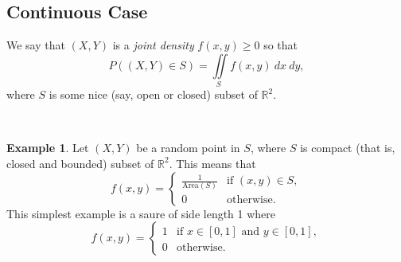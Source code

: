 \documentclass[12pt,a4paper]{article}
\theoremstyle{definition}
\newtheorem{example}{Example}[section]
\theoremstyle{definition}
\theoremstyle{definition}
\theoremstyle{definition}
\theoremstyle{remark}
\theoremstyle{definition}
\newcommand{\dispsty}{\displaystyle}
\begin{document}
\subsection{Continuous Case}
\begin{tcolorbox}[colback=white]
	We say that $(X,Y)$ is a \textit{joint density} $f(x,y)\geq 0$ so that \[
	P\left((X,Y)\in S\right)=\underset{S\ \ }{\iint}f(x,y)\ dx\ dy,
	\] where $S$ is some nice (say, open or closed) subset of $\mathbb{R}^2$.
\end{tcolorbox}
\
\begin{example}
	Let $(X,Y)$ be a random point in $S$, where $S$ is compact (that is, closed and bounded) subset of $\mathbb{R}^2$. This means that \[
	f(x,y)=\begin{cases}
	\dispsty\frac{1}{\text{Area}(S)}&\text{if $(x,y)\in S$},\\
	0&\text{otherwise.}
	\end{cases}
	\] This simplest example is a saure of side length 1 where \[
	f(x,y)=\begin{cases}
	1&\text{if $x\in[0,1]$ and $y\in[0,1]$},\\
	0&\text{otherwise}.
	\end{cases}
	\]
\end{example}
\newpage
\end{document}

